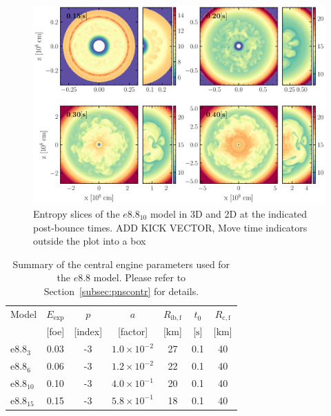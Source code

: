 \documentclass[fleqn,usenatbib]{mnras}
\newcommand{\km}{\ensuremath{\mathrm{km}}\xspace}
\renewcommand{\sec}{\xspace\ensuremath{\text{s}}}
\newcommand{\COM}[1]{{\color{orange}#1}}
\begin{document}
\begin{figure}
 \includegraphics[width=\textwidth]{pic/e8_10_2d3d_sto_cuts_4times.pdf}
 \caption{Entropy slices of the $e8.8_{10}$ model in 3D and 2D at the indicated post-bounce times. \COM{ADD KICK VECTOR, Move time indicators outside the plot into a box} }
 \label{fig:e8 sto 4 times}
\end{figure}


\begin{table}
\centering
   \begin{tabular}{l| c | c | c | c | c | c}
  \label{table:e8param}
  Model &$E_{\mathrm{exp}}$& $p$ & $a$ & $R_{\mathrm{ib,f}}$ & $t_0$ & $R_{\mathrm{c,f}}$\\
                & [foe] & [index]  & [factor]  & [$\km$]  & [$\sec$]& [$\km$] \\
  \hline \hline
  $\mathrm{e}8.8_{3}$  &  0.03 &    -3 & $1.0\times 10^{-2}$ &27 & 0.1 & 40 \\
  $\mathrm{e}8.8_{6}$  &  0.06 &   -3 & $1.2\times 10^{-2}$ &22 & 0.1 & 40 \\
  $\mathrm{e}8.8_{10}$ & 0.10 &   -3 & $4.0\times 10^{-1}$ & 20 & 0.1 & 40 \\
  $\mathrm{e}8.8_{15}$ & 0.15 &   -3 & $5.8\times 10^{-1}$ & 18 & 0.1 & 40 \\
  \end{tabular}
\caption{Summary of the central engine parameters used for the $e8.8$ model. Please refer to Section~\ref{subsec:pnscontr} for details.}
\end{table}
\end{document}

